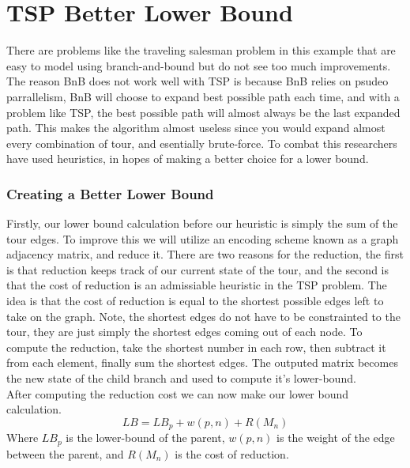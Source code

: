 
\section{TSP Better Lower Bound}
    There are problems like the traveling salesman problem in this example
    that are easy to model using branch-and-bound but do not see too much improvements.
    The reason BnB does not work well with TSP is because BnB relies on psudeo
    parrallelism, BnB will choose to expand best possible path each time, and 
    with a problem like TSP, the best possible path will almost always be the 
    last expanded path. This makes the algorithm almost useless since you 
    would expand almost every combination of tour, and esentially brute-force.
    To combat this researchers have used heuristics, in hopes of making a better
    choice for a lower bound.

    \subsubsection{Creating a Better Lower Bound}
    Firstly, our lower bound calculation before our heuristic is simply the sum 
    of the tour edges. To improve this we will utilize an encoding scheme known as 
    a graph adjacency matrix, and reduce it. There are two reasons for the reduction, 
    the first is that reduction keeps track of our current state of the tour, and the second
    is that the cost of reduction is an admissiable heuristic in the TSP problem.
    The idea is that the cost of reduction is equal to the shortest possible edges left to 
    take on the graph. Note, the shortest edges do not have to be constrainted to the tour, they
    are just simply the shortest edges coming out of each node. To compute the reduction, take the
    shortest number in each row, then subtract it from each element, finally sum the shortest edges.
    The outputed matrix becomes the new state of the child branch and used to compute it's lower-bound.\\

    After computing the reduction cost we can now make our lower bound calculation.
    \begin{equation}
        LB = LB_p + w(p, n) + R(M_n)
    \end{equation}
    Where $LB_p$ is the lower-bound of the parent, $w(p, n)$ is the weight of the edge
    between the parent, and $R(M_n)$ is the cost of reduction. \\
    
